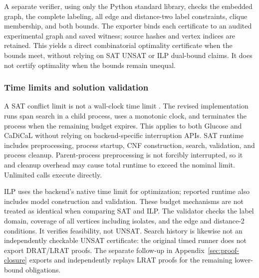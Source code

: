 A separate verifier, using only the Python standard library, checks the
embedded graph, the complete labeling, all edge and distance-two label
constraints, clique membership, and both bounds. The exporter binds each
certificate to an audited experimental graph and saved witness; source
hashes and vertex indices are retained. This yields a direct combinatorial
optimality certificate when the bounds meet, without relying on SAT UNSAT
or ILP dual-bound claims. It does not certify optimality when the bounds
remain unequal.

\subsubsection{Time limits and solution validation}
A SAT conflict limit is not a wall-clock time limit \cite{pysat}. The revised
implementation runs span search in a child process, uses a monotonic clock,
and terminates the process when the remaining budget expires. This applies
to both Glucose and CaDiCaL without relying on backend-specific interruption
APIs. SAT runtime includes preprocessing, process startup, CNF construction,
search, validation, and process cleanup. Parent-process preprocessing is not
forcibly interrupted, so it and cleanup overhead may cause total runtime
to exceed the nominal limit. Unlimited calls execute directly.

ILP uses the backend's native time limit for optimization; reported runtime
also includes model construction and validation. These budget mechanisms
are not treated as identical when comparing SAT and ILP.
The validator checks the label domain, coverage of all vertices including
isolates, and the edge and distance-2 conditions. It verifies feasibility,
not UNSAT. Search history is likewise not an independently checkable UNSAT
certificate: the original timed runner does not export DRAT/LRAT proofs.
The separate follow-up in Appendix~\ref{sec:proof-closure} exports and
independently replays LRAT proofs for the remaining lower-bound obligations.
